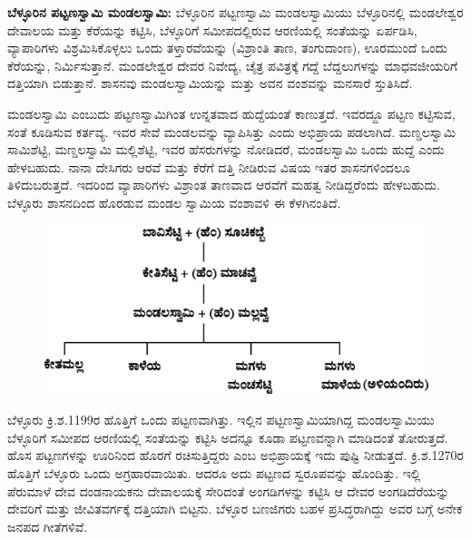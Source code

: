 \textbf{ಬೆಳ್ಳೂರಿನ ಪಟ್ಟಣಸ್ವಾಮಿ ಮಂಡಲಸ್ವಾಮಿ: } ಬೆಳ್ಳೂರಿನ ಪಟ್ಟಣಸ್ವಾಮಿ ಮಂಡಲಸ್ವಾಮಿಯು ಬೆಳ್ಳೂರಿನಲ್ಲಿ ಮಂಡಲೇಶ್ವರ ದೇವಾಲಯ ಮತ್ತು ಕೆರೆಯನ್ನು ಕಟ್ಟಿಸಿ, ಬೆಳ್ಳೂರಿಗೆ ಸಮೀಪದಲ್ಲಿರುವ ಆರಣಿಯಲ್ಲಿ ಸಂತೆಯನ್ನು ಏರ್ಪಡಿಸಿ, ವ್ಯಾಪಾರಿಗಳು ವಿಶ್ರಮಿಸಿಕೊಳ್ಳಲು ಒಂದು ತಳ್ತಾರವೆಯನ್ನು (ವಿಶ್ರಾಂತಿ ತಾಣ, ತಂಗುದಾಂಣ), ಊರಮುಂದೆ ಒಂದು ಕೆರೆಯನ್ನು, ನಿರ್ಮಿಸುತ್ತಾನೆ. ಮಂಡಲೇಶ್ವರ ದೇವರ ನಿವೇದ್ಯ, ಚೈತ್ರ ಪವಿತ್ರಕ್ಕೆ ಗದ್ದೆ ಬೆದ್ದಲುಗಳನ್ನು ಮಾಧವಜೀಯರಿಗೆ ದತ್ತಿಯಾಗಿ ಬಿಡುತ್ತಾನೆ. ಶಾಸನವು ಮಂಡಲಸ್ವಾಮಿಯನ್ನು ಮತ್ತು ಅವನ ವಂಶವನ್ನು ಮನಸಾರೆ ಸ್ತುತಿಸಿದೆ.

ಮಂಡಲಸ್ವಾಮಿ ಎಂಬುದು ಪಟ್ಟಣಸ್ವಾಮಿಗಿಂತ ಉನ್ನತವಾದ ಹುದ್ದೆಯಂತೆ ಕಾಣುತ್ತದೆ. ಇವರದ್ದೂ ಪಟ್ಟಣ ಕಟ್ಟಿಸುವ, ಸಂತೆ ಕೂಡಿಸುವ ಕರ್ತವ್ಯ. ಇವರ ಸೇವೆ ಮಂಡಲವನ್ನು ವ್ಯಾಪಿಸಿತ್ತು ಎಂದು ಅಭಿಪ್ರಾಯ ಪಡಲಾಗಿದೆ. ಮಣ್ಡಲಸ್ವಾಮಿ ಸಾಮಿಶೆಟ್ಟಿ, ಮಣ್ಡಲಸ್ವಾಮಿ ಮಲ್ಲಿಶೆಟ್ಟಿ, ಇವರ ಹೆಸರುಗಳನ್ನು ನೋಡಿದರೆ, ಮಂಡಲಸ್ವಾಮಿ ಒಂದು ಹುದ್ದೆ ಎಂದು ಹೇಳಬಹುದು. ನಾನಾ ದೇಸಿಗರು ಆರವೆ ಮತ್ತು ಕೆರೆಗೆ ದತ್ತಿ ನೀಡಿರುವ ವಿಷಯ ಇತರ ಶಾಸನಗಳಿಂದಲೂ ತಿಳಿದುಬರುತ್ತದೆ. ಇದರಿಂದ ವ್ಯಾಪಾರಿಗಳು ವಿಶ್ರಾಂತ ತಾಣವಾದ ಆರವೆಗೆ ಮಹತ್ವ ನೀಡಿದ್ದರೆಂದು ಹೇಳಬಹುದು. ಬೆಳ್ಳೂರು ಶಾಸನದಿಂದ ಹೊರಡುವ ಮಂಡಲ ಸ್ವಾಮಿಯ ವಂಶಾವಳಿ ಈ ಕೆಳಗಿನಂತಿದೆ.

\begin{figure}[!h]
\includegraphics{images/chap8/chap8fig2.jpeg}
\end{figure}

ಬೆಳ್ಳೂರು ಕ್ರಿ.ಶ.1199ರ ಹೊತ್ತಿಗೆ ಒಂದು ಪಟ್ಟಣವಾಗಿತ್ತು. ಇಲ್ಲಿನ ಪಟ್ಟಣಸ್ವಾಮಿಯಾಗಿದ್ದ ಮಂಡಲಸ್ವಾಮಿಯು ಬೆಳ್ಳೂರಿಗೆ ಸಮೀಪದ ಆರಣಿಯಲ್ಲಿ ಸಂತೆಯನ್ನು ಕಟ್ಟಿಸಿ ಅದನ್ನೂ ಕೂಡಾ ಪಟ್ಟಣವನ್ನಾಗಿ ಮಾಡಿದಂತೆ ತೋರುತ್ತದೆ. ಹೊಸ ಪಟ್ಟಣಗಳನ್ನು ಊರಿನಿಂದ ಹೊರಗೆ ರಚಿಸುತ್ತಿದ್ದರು ಎಂಬ ಅಭಿಪ್ರಾಯಕ್ಕೆ ಇದು ಪುಷ್ಟಿ ನೀಡುತ್ತದೆ. ಕ್ರಿ.ಶ.1270ರ ಹೊತ್ತಿಗೆ ಬೆಳ್ಳೂರು ಒಂದು ಅಗ್ರಹಾರವಾಯಿತು. ಆದರೂ ಅದು ಪಟ್ಟಣದ ಸ್ವರೂಪವನ್ನು ಹೊಂದಿತ್ತು. ಇಲ್ಲಿ ಪೆರುಮಾಳೆ ದೇವ ದಂಡನಾಯಕನು ದೇವಾಲಯಕ್ಕೆ ಸೇರಿದಂತೆ ಅಂಗಡಿಗಳನ್ನು ಕಟ್ಟಿಸಿ ಆ ದೇವರ ಅಂಗಡಿದೆರೆಯನ್ನು ದೇವರಿಗೆ ಮತ್ತು ಜೀವಿತವರ್ಗಕ್ಕೆ ದತ್ತಿಯಾಗಿ ಬಿಟ್ಟನು. ಬೆಳ್ಳೂರ ಬಣಜಿಗರು ಬಹಳ ಪ್ರಸಿದ್ಧರಾಗಿದ್ದು ಅವರ ಬಗ್ಗೆ ಅನೇಕ ಜನಪದ ಗೀತೆಗಳಿವೆ.

